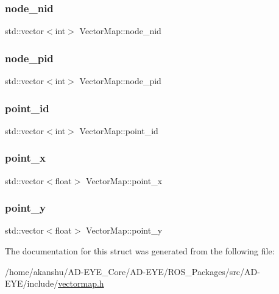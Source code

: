\subsubsection{\texorpdfstring{node\+\_\+nid}{node\_nid}}
{\footnotesize\ttfamily std\+::vector$<$int$>$ Vector\+Map\+::node\+\_\+nid}

\mbox{\label{structVectorMap_a7dd4c629e1d068603dba6c8364c8e5c8}} 
\subsubsection{\texorpdfstring{node\+\_\+pid}{node\_pid}}
{\footnotesize\ttfamily std\+::vector$<$int$>$ Vector\+Map\+::node\+\_\+pid}

\mbox{\label{structVectorMap_ac0309f6f1c51b9238e6784ce3e2e4dfc}} 
\subsubsection{\texorpdfstring{point\+\_\+id}{point\_id}}
{\footnotesize\ttfamily std\+::vector$<$int$>$ Vector\+Map\+::point\+\_\+id}

\mbox{\label{structVectorMap_af669a9afada9f21f7984d78acd285702}} 
\subsubsection{\texorpdfstring{point\+\_\+x}{point\_x}}
{\footnotesize\ttfamily std\+::vector$<$float$>$ Vector\+Map\+::point\+\_\+x}

\mbox{\label{structVectorMap_a46e5e54fff8de0238e1bb033e549c61b}} 
\subsubsection{\texorpdfstring{point\+\_\+y}{point\_y}}
{\footnotesize\ttfamily std\+::vector$<$float$>$ Vector\+Map\+::point\+\_\+y}



The documentation for this struct was generated from the following file\+:\begin{DoxyCompactItemize}
\item 
/home/akanshu/\+A\+D-\/\+E\+Y\+E\+\_\+\+Core/\+A\+D-\/\+E\+Y\+E/\+R\+O\+S\+\_\+\+Packages/src/\+A\+D-\/\+E\+Y\+E/include/\hyperlink{vectormap_8h}{vectormap.\+h}\end{DoxyCompactItemize}
